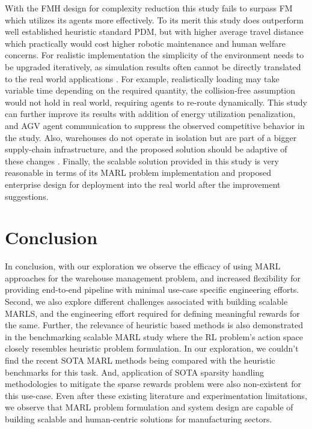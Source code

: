 \documentclass{article}
\begin{document}
With the FMH design for complexity reduction this study fails to surpass FM which utilizes its agents more effectively.
To its merit this study does outperform well established heuristic standard PDM, but with higher average travel distance which practically would cost higher robotic maintenance and human welfare concerns.
For realistic implementation the simplicity of the environment needs to be upgraded iteratively, as simulation results often cannot be directly translated to the real world applications \cite{zhao2020sim}.
For example, realistically loading may take variable time depending on the required quantity, the collision-free assumption would not hold in real world, requiring agents to re-route dynamically.
This study can further improve its results with addition of energy utilization penalization, and AGV agent communication to suppress the observed competitive behavior in the study.
Also, warehouses do not operate in isolation but are part of a bigger supply-chain infrastructure, and the proposed solution should be adaptive of these changes \cite{lu2018learning}.
Finally, the scalable solution provided in this study is very reasonable in terms of its MARL problem implementation and proposed enterprise design for deployment into the real world after the improvement suggestions.


\section{Conclusion}


In conclusion, with our exploration we observe the efficacy of using MARL approaches for the warehouse management problem, and increased flexibility for providing end-to-end pipeline with minimal use-case specific engineering efforts.
Second, we also explore different challenges associated with building scalable MARLS, and the engineering effort required for defining meaningful rewards for the same.
Further, the relevance of heuristic based methods is also demonstrated in the benchmarking scalable MARL study where the RL problem’s action space closely resembles heuristic problem formulation.
In our exploration, we couldn’t find the recent SOTA MARL methods being compared with the heuristic benchmarks for this task.
And, application of SOTA sparsity handling methodologies to mitigate the sparse rewards problem were also non-existent for this use-case.
Even after these existing literature and experimentation limitations, we observe that MARL problem formulation and system design are capable of building scalable and human-centric solutions for manufacturing sectors.




\end{document}
